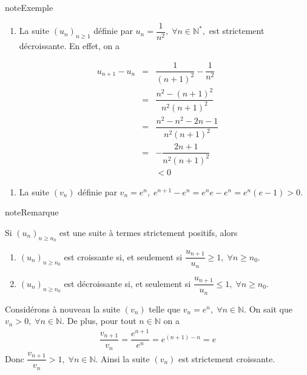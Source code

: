 \documentclass[letterpaper,10pt,french]{jupyterBook}
\begin{document}
\begin{sphinxadmonition}{note}{Exemple}
\begin{enumerate}
%
\item {} 
\sphinxAtStartPar
La suite \((u_n)_{n\geq1}\) définie par \(u_n=\dfrac{1}{n^2},\;\forall n\in \mathbb{N}^{*},\) est strictement décroissante. En effet, on a

\end{enumerate}
\begin{eqnarray*}
u_{n+1}-u_n
&=& \dfrac{1}{(n+1)^2}-\dfrac{1}{n^2}\\
&=& \dfrac{n^2-(n+1)^2}{n^2(n+1)^2}\\
&=& \dfrac{n^2-n^2-2n-1}{n^2(n+1)^2}\\
&=& -\dfrac{2n+1}{n^2(n+1)^2}\\
& & <0
\end{eqnarray*}\begin{enumerate}
%
\item {} 
\sphinxAtStartPar
La suite \((v_n)\) définie par \(v_n=e^n,\;e^{n+1}-e^n=e^n e-e^n=e^n (e-1)>0.\)

\end{enumerate}
\end{sphinxadmonition}

\begin{sphinxadmonition}{note}{Remarque}

\sphinxAtStartPar
Si \((u_n)_{n\geq n_0}\) est une suite à termes strictement positifs, alors
\begin{enumerate}
%
\item {} 
\sphinxAtStartPar
\((u_n)_{n\geq n_0}\) est croissante si, et seulement si \(\dfrac{u_{n+1}}{u_n}\geq1,\;\forall n\geq n_0.\)

\item {} 
\sphinxAtStartPar
\((u_n)_{n\geq n_0}\) est décroissante si, et seulement si \(\dfrac{u_{n+1}}{u_n}\leq 1,\;\forall n\geq n_0.\)

\end{enumerate}

\sphinxAtStartPar
Considérons à nouveau la suite \((v_n)\) telle que \(v_n=e^n,\;\forall n\in \mathbb{N}.\) On sait que \(v_n>0,\;\forall n\in \mathbb{N}.\) De plus, pour tout \(n\in \mathbb{N}\) on a
\begin{equation*}
\begin{split}
\dfrac{v_{n+1}}{v_n}=\dfrac{e^{n+1}}{e^n}=e^{(n+1)-n}=e
\end{split}
\end{equation*}
\sphinxAtStartPar
Donc \(\dfrac{v_{n+1}}{v_n}>1,\;\forall n\in \mathbb{N}.\) Ainsi la suite \((v_n)\) est strictement croissante.
\end{sphinxadmonition}
\end{document}
